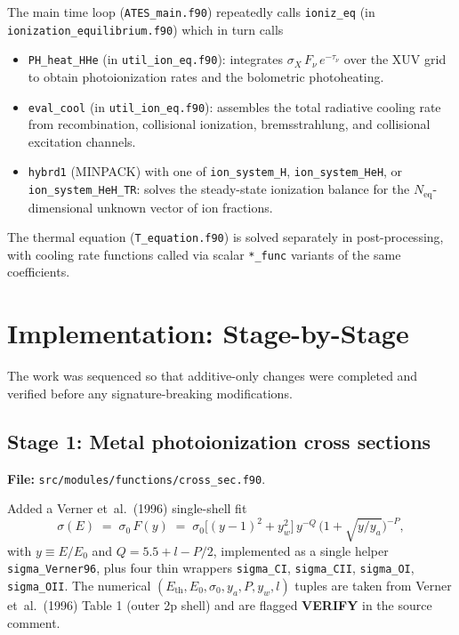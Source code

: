 \documentclass[english,a4paper]{kiseon_memo}
\begin{document}
The main time loop (\texttt{ATES\_main.f90}) repeatedly calls
\texttt{ioniz\_eq} (in \texttt{ionization\_equilibrium.f90}) which in
turn calls
\begin{itemize}
  \item \texttt{PH\_heat\_HHe} (in \texttt{util\_ion\_eq.f90}): integrates
    \(\sigma_X\, F_\nu\, e^{-\tau_\nu}\) over the XUV grid to obtain
    photoionization rates and the bolometric photoheating.
  \item \texttt{eval\_cool} (in \texttt{util\_ion\_eq.f90}): assembles
    the total radiative cooling rate from recombination, collisional
    ionization, bremsstrahlung, and collisional excitation channels.
  \item \texttt{hybrd1} (MINPACK) with one of \texttt{ion\_system\_H},
    \texttt{ion\_system\_HeH}, or \texttt{ion\_system\_HeH\_TR}: solves
    the steady-state ionization balance for the
    \(N_{\mathrm{eq}}\)-dimensional unknown vector of ion fractions.
\end{itemize}

The thermal equation (\texttt{T\_equation.f90}) is solved separately
in post-processing, with cooling rate functions called via scalar
\texttt{*\_func} variants of the same coefficients.

\section{Implementation: Stage-by-Stage}

The work was sequenced so that additive-only changes were completed
and verified before any signature-breaking modifications.

\subsection{Stage 1: Metal photoionization cross sections}
\textbf{File:} \texttt{src/modules/functions/cross\_sec.f90}.

Added a Verner et~al.~(1996) single-shell fit
\[
  \sigma(E) \;=\; \sigma_0\,F(y) \;=\;
  \sigma_0\bigl[(y-1)^{2} + y_w^{2}\bigr]\,y^{-Q}\,
  \bigl(1 + \sqrt{y/y_a}\bigr)^{-P},
\]
with \(y \equiv E/E_0\) and \(Q = 5.5 + l - P/2\), implemented as a
single helper \texttt{sigma\_Verner96}, plus four thin wrappers
\texttt{sigma\_CI}, \texttt{sigma\_CII}, \texttt{sigma\_OI},
\texttt{sigma\_OII}.  The numerical
\((E_{\mathrm{th}}, E_0, \sigma_0, y_a, P, y_w, l)\) tuples are taken
from Verner et~al.~(1996) Table 1 (outer 2p shell) and are flagged
\textbf{VERIFY} in the source comment.
\end{document}
